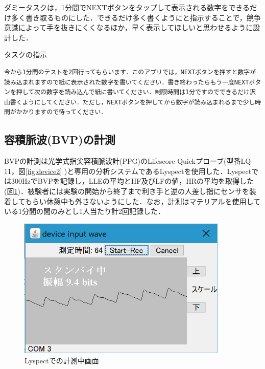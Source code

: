 ダミータスクは，1分間でNEXTボタンをタップして表示される数字をできるだけ多く書き取るものにした．できるだけ多く書くようにと指示することで，競争意識によって手を抜きにくくなるほか，早く表示してほしいと思わせるように設計した．

\begin{itembox}[l]{タスクの指示}
\begin{verbatim}
今から1分間のテストを2回行ってもらいます．このアプリでは，NEXTボタンを押すと数字が読み込まれますので紙に表示された数字を書いてください．書き終わったらもう一度NEXTボタンを押して次の数字を読み込んで紙に書いてください．制限時間は1分ですのでできるだけ沢山書くようにしてください．ただし，NEXTボタンを押してから数字が読み込まれるまで少し時間がかかりますので待ってください．
\end{verbatim}
\end{itembox}

\subsection{容積脈波(BVP)の計測}
BVPの計測は光学式指尖容積脈波計(PPG)のLifescore Quickプローブ(型番LQ-11，図\ref{fig:device2} )と専用の分析システムであるLyspect\cite{chaotechlyspect}を使用した．Lyspectでは300HzでBVPを記録し，LLEの平均とHF及びLFの値，HRの平均を取得した(図\ref{fig:lyspect})．被験者には実験の開始から終了まで利き手と逆の人差し指にセンサを装着してもらい休憩中も外さないようにした．なお，計測はマテリアルを使用している1分間の間のみとし1人当たり計2回記録した．

\begin{figure}[htbp]
  \begin{minipage}{\hsize}
    \begin{center}
       \includegraphics[width=100mm]{img/inputwave}
    \end{center}
    \caption{Lyspectでの計測中画面}
    \label{fig:lyspect}
  \end{minipage}
\end{figure}

